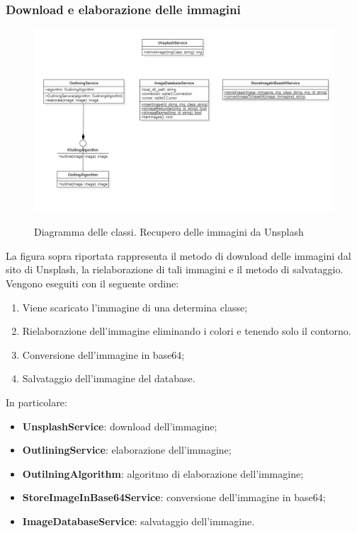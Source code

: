 \subsubsection{Download e elaborazione delle immagini}

\begin{figure}[H]
    \centering
    \includegraphics[scale = 0.6]{img/downloadImg.png}\\
    \caption{Diagramma delle classi. Recupero delle immagini da Unsplash}
\end{figure}

La figura sopra riportata rappresenta il metodo di download delle immagini dal sito di Unsplash, la rielaborazione di tali immagini e il metodo di salvataggio. Vengono eseguiti con il seguente ordine:
\begin{enumerate}
    \item Viene scaricato l'immagine di una determina classe;
    \item Rielaborazione dell'immagine eliminando i colori e tenendo solo il contorno.
    \item Conversione dell'immagine in base64;
    \item Salvataggio dell'immagine del database.
\end{enumerate}

In particolare:
\begin{itemize}
    \item \textbf{UnsplashService}: download dell'immagine;
    \item \textbf{OutliningService}: elaborazione dell'immagine;
    \item \textbf{OutilningAlgorithm}: algoritmo di elaborazione dell'immagine;
    \item \textbf{StoreImageInBase64Service}: conversione dell'immagine in base64;
    \item \textbf{ImageDatabaseService}: salvataggio dell'immagine.
\end{itemize}

